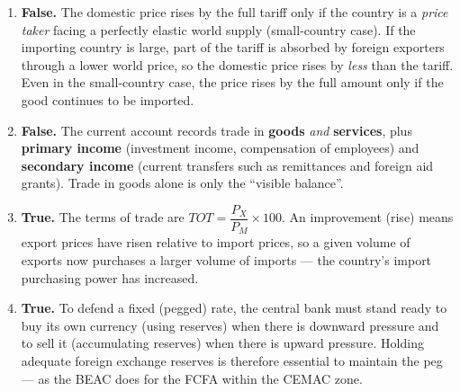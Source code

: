 \documentclass[11pt]{article}
\newcommand{\cle}[1]{{\popxbold\color{popdark}#1}}
\begin{document}
\begin{corrige}
\begin{enumerate}
\item \textbf{False.} The domestic price rises by the full tariff only if the country is a \emph{price taker} facing a perfectly elastic world supply (small-country case). If the importing country is large, part of the tariff is absorbed by foreign exporters through a lower world price, so the domestic price rises by \emph{less} than the tariff. Even in the small-country case, the price rises by the full amount only if the good continues to be imported.
\item \textbf{False.} The current account records trade in \textbf{goods} \emph{and} \textbf{services}, plus \textbf{primary income} (investment income, compensation of employees) and \textbf{secondary income} (current transfers such as remittances and foreign aid grants). Trade in goods alone is only the ``visible balance''.
\item \textbf{True.} The terms of trade are $TOT = \dfrac{P_X}{P_M}\times 100$. An improvement (rise) means export prices have risen relative to import prices, so a given volume of exports now purchases a larger volume of imports — the country's import purchasing power has increased.
\item \textbf{True.} To defend a fixed (pegged) rate, the central bank must stand ready to buy its own currency (using reserves) when there is downward pressure and to sell it (accumulating reserves) when there is upward pressure. Holding adequate \cle{foreign exchange reserves} is therefore essential to maintain the peg — as the BEAC does for the FCFA within the CEMAC zone.
\end{enumerate}
\end{corrige}
\end{document}
